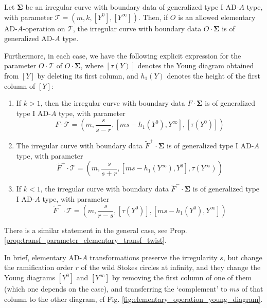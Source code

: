 \documentclass[11pt,a4paper]{amsart}
\numberwithin{equation}{section}
\begin{document}
\begin{theorem}
Let $\bm\Sigma$ be an irregular curve with boundary data of generalized type I AD-$A$ type, with parameter $\mathcal T=(m,k,[Y^0], [Y^\infty])$. Then, if $O$ is an allowed elementary AD-$A$-operation on $\mathcal T$, the irregular curve with boundary data $O\cdot \bm\Sigma$ is of generalized AD-$A$ type. 

Furthermore, in each case, we have the following explicit expression for the parameter $O\cdot \mathcal T$ of $O\cdot\bm\Sigma$, where $[\tau(Y)]$ denotes the Young diagram obtained from $[Y]$ by deleting its first column, and $h_1(Y)$ denotes the height of the first column of $[Y]$:
\begin{enumerate}
\item If $k>1$, then the irregular curve with boundary data $F\cdot \bm\Sigma$ is  of generalized type I AD-$A$ type, with parameter
\begin{equation}
F\cdot \mathcal T=\left(m,\frac{s}{s-r},[ms-h_1(Y^0),Y^{\infty}], [\tau(Y^{0})]\right) 
\end{equation}
\item The irregular curve with boundary data $\widetilde F^+\cdot \bm\Sigma$ is of generalized type I AD-$A$ type, with parameter
\begin{equation}
\widetilde F^+\cdot\mathcal T=\left(m,\frac{s}{s+r},[ms-h_1(Y^\infty),Y^{0}], \tau(Y^{\infty})\right) 
\end{equation}
\item If $k<1$, the irregular curve with boundary data $\widetilde F^-\cdot \bm\Sigma$ is of  generalized type I AD-$A$ type, with parameter
\begin{equation}
\widetilde F^-\cdot\mathcal T=\left(m,\frac{s}{r-s},[\tau(Y^{0})], [ms-h_1(Y^0),Y^{\infty}]\right) 
\end{equation}
\end{enumerate}
\end{theorem}
There is a similar statement in the general case, see Prop. \ref{prop:transf_parameter_elementary_transf_twist}.

In brief, elementary AD-$A$ transformations preserve the irregularity $s$, but change the ramification order $r$ of the wild Stokes circles at infinity, and they change the Young diagrams $[Y^0]$ and $[Y^\infty]$ by removing the first column of one of them (which one depends on the case), and transferring the `complement' to $ms$ of that column to the other diagram, cf Fig. \ref{fig:elementary_operation_young_diagram}.
\end{document}
